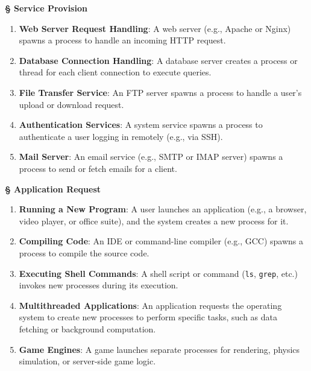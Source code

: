 \documentclass[a4paper]{book}
\newcommand{\sfbf}[1]{{\normalsize\textsf{\textbf{§ #1}}}}
\begin{document}
\sfbf{Service Provision}

\begin{enumerate}
\item 
\textbf{Web Server Request Handling}: A web server (e.g., Apache or Nginx) spawns a process to handle an incoming HTTP request.

\item 
\textbf{Database Connection Handling}: A database server creates a process or thread for each client connection to execute queries.

\item 
\textbf{File Transfer Service}: An FTP server spawns a process to handle a user's upload or download request.

\item 
\textbf{Authentication Services}: A system service spawns a process to authenticate a user logging in remotely (e.g., via SSH).

\item 
\textbf{Mail Server}: An email service (e.g., SMTP or IMAP server) spawns a process to send or fetch emails for a client.

\end{enumerate}

\sfbf{Application Request}

\begin{enumerate}
\item 
\textbf{Running a New Program}: A user launches an application (e.g., a browser, video player, or office suite), and the system creates a new process for it.

\item 
\textbf{Compiling Code}: An IDE or command-line compiler (e.g., GCC) spawns a process to compile the source code.

\item 
\textbf{Executing Shell Commands}: A shell script or command (\verb|ls|, \verb|grep|, etc.) invokes new processes during its execution.

\item 
\textbf{Multithreaded Applications}: An application requests the operating system to create new processes to perform specific tasks, such as data fetching or background computation.

\item 
\textbf{Game Engines}: A game launches separate processes for rendering, physics simulation, or server-side game logic.

\end{enumerate}
\end{document}
